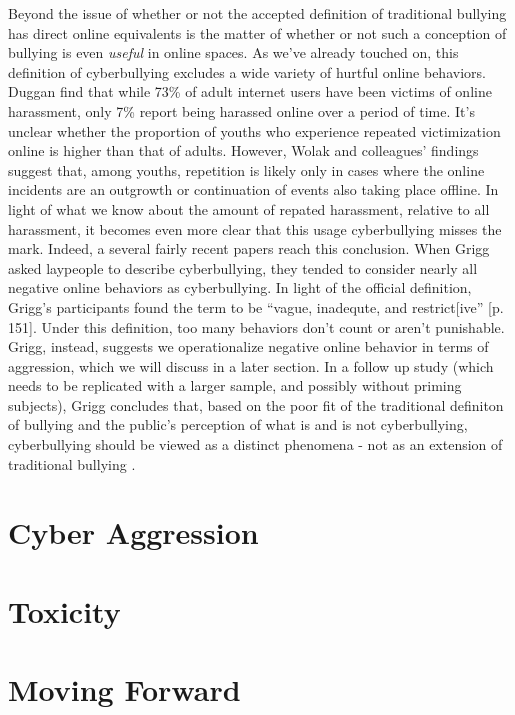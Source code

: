 \documentclass{sigchi}
\begin{document}
Beyond the issue of whether or not the accepted definition of traditional bullying has direct online equivalents is the matter of whether or not such a conception of bullying is even \textit{useful} in online spaces.  As we've already touched on, this definition of cyberbullying excludes a wide variety of hurtful online behaviors.  Duggan \cite{Duggan2014Online} find that while 73\% of adult internet users have been victims of online harassment, only 7\% report being harassed online over a period of time.  It's unclear whether the proportion of youths who experience repeated victimization online is higher than that of adults.  However, Wolak and colleagues' findings \cite{Wolak2007Does} suggest that, among youths, repetition is likely only in cases where the online incidents are an outgrowth or continuation of events also taking place offline. In light of what we know about the amount of repated harassment, relative to all harassment, it becomes even more clear that this usage cyberbullying misses the mark.  Indeed, a several fairly recent papers reach this conclusion.  When Grigg \cite{Grigg2010CyberAggression} asked laypeople to describe cyberbullying, they tended to consider nearly all negative online behaviors as cyberbullying.  In light of the official definition, Grigg's participants found the term to be ``vague, inadequte, and restrict[ive'' [p. 151].  Under this definition, too many behaviors don't count or aren't punishable.  Grigg, instead, suggests we operationalize negative online behavior in terms of aggression, which we will discuss in a later section.  In a follow up study (which needs to be replicated with a larger sample, and possibly without priming subjects), Grigg concludes that, based on the poor fit of the traditional definiton of bullying and the public's perception of what is and is not cyberbullying, cyberbullying should be viewed as a distinct phenomena - not as an extension of traditional bullying \cite{Grigg2012Definitional}.  




\section{Cyber Aggression}

\section{Toxicity}

\section{Moving Forward}

\balance{}



\end{document}
